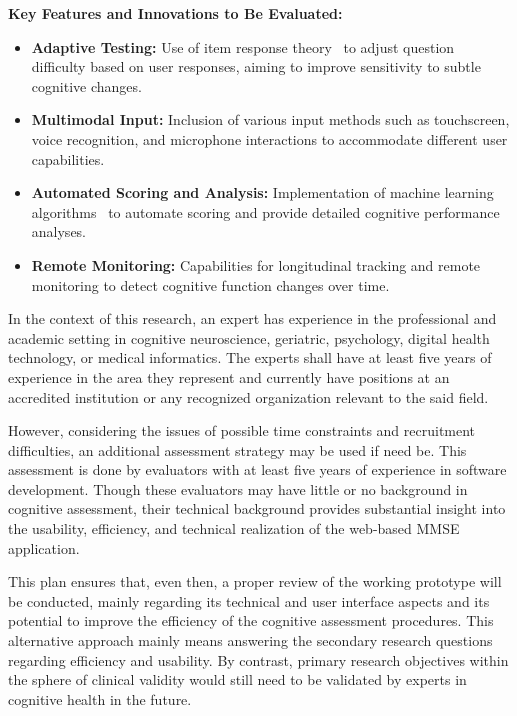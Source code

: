 \textbf{Key Features and Innovations to Be Evaluated:}
\begin{itemize}
    \item \textbf{Adaptive Testing:} Use of item response theory~\cite{embretson2013item} to adjust question difficulty based on user responses, aiming to improve sensitivity to subtle cognitive changes.
    \item \textbf{Multimodal Input:} Inclusion of various input methods such as touchscreen, voice recognition, and microphone interactions to accommodate different user capabilities.
    \item \textbf{Automated Scoring and Analysis:} Implementation of machine learning algorithms~\cite{shatte2019machine} to automate scoring and provide detailed cognitive performance analyses.
    \item \textbf{Remote Monitoring:} Capabilities for longitudinal tracking and remote monitoring to detect cognitive function changes over time.
\end{itemize}

In the context of this research, an expert has experience in the professional and academic setting in cognitive neuroscience, geriatric, psychology, digital health technology, or medical informatics. The experts shall have at least five years of experience in the area they represent and currently have positions at an accredited institution or any recognized organization relevant to the said field.

However, considering the issues of possible time constraints and recruitment difficulties, an additional assessment strategy may be used if need be. This assessment is done by evaluators with at least five years of experience in software development. Though these evaluators may have little or no background in cognitive assessment, their technical background provides substantial insight into the usability, efficiency, and technical realization of the web-based MMSE application.

This plan ensures that, even then, a proper review of the working prototype will be conducted, mainly regarding its technical and user interface aspects and its potential to improve the efficiency of the cognitive assessment procedures. This alternative approach mainly means answering the secondary research questions regarding efficiency and usability. By contrast, primary research objectives within the sphere of clinical validity would still need to be validated by experts in cognitive health in the future.

